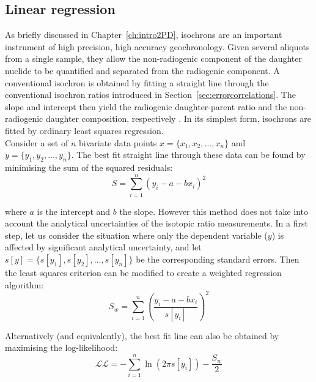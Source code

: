 \begin{refsection}
\section{Linear regression}
\label{sec:regression}

As briefly discussed in Chapter~\ref{ch:intro2PD}, isochrons are an
important instrument of high precision, high accuracy geochronology.
Given several aliquots from a single sample, they allow the
non-radiogenic component of the daughter nuclide to be quantified and
separated from the radiogenic component. A conventional isochron is
obtained by fitting a straight line through the conventional isochron
ratios introduced in Section~\ref{sec:errorcorrelations}. The slope
and intercept then yield the radiogenic daughter-parent ratio and the
non-radiogenic daughter composition, respectively
\citep{nicolaysen1961}. In its simplest form, isochrons are fitted by
ordinary least squares regression.\\

Consider a set of $n$ bivariate data points $x =
\{x_1,x_2,\ldots,x_n\}$ and $y = \{y_1,y_2,\ldots,y_n\}$.  The best
fit straight line through these data can be found by minimising the
sum of the squared residuals:
\begin{equation}
  S = \sum\limits_{i=1}^{n}\left( y_i - a - b x_i \right)^2
  \label{eq:S}
\end{equation}

\noindent where $a$ is the intercept and $b$ the slope. However this
method does not take into account the analytical uncertainties of the
isotopic ratio measurements. In a first step, let us consider the
situation where only the dependent variable ($y$) is affected by
significant analytical uncertainty, and let $s[y] =
\{s[y_1],s[y_2],\ldots,s[y_n]\}$ be the corresponding standard
errors. Then the least squares criterion can be modified to create a
weighted regression algorithm:
\begin{equation}
  S_w = \sum\limits_{i=1}^{n}\left( \frac{y_i - a - b x_i}{s[y_i]} \right)^2
  \label{eq:Swtd}
\end{equation}

Alternatively (and equivalently), the best fit line can also be
obtained by maximising the log-likelihood:
\begin{equation}
  \mathcal{LL} = - \sum\limits_{i=1}^{n} \ln\left(2 \pi s[y_i] \right)
  - \frac{S_w}{2}
  \label{eq:L}
\end{equation}


\end{refsection}
